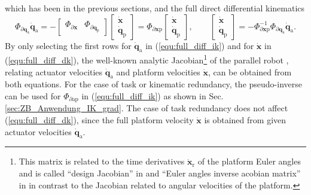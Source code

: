 \documentclass[robotics,article,submit,moreauthors,pdftex]{Definitions/mdpi}
\newcommand{\bm}[1]{\boldsymbol{#1}}
\let\Phi\varPhi
\begin{document}
%
which has been  in the previous sections, and the full direct differential kinematics
%
\begin{equation}
\bm{\Phi}_{\partial\bm{q}_{\mathrm{a}}} \dot{\bm{q}}_{\mathrm{a}} 
=
- 
\begin{bmatrix} \bm{\Phi}_{\partial\bm{x}} & \bm{\Phi}_{\partial\bm{q}_{\mathrm{p}}} \end{bmatrix}
\begin{bmatrix}
\dot{\bm{x}} \\
\dot{\bm{q}}_{\mathrm{p}}
\end{bmatrix}
=
\bm{\Phi}_{\partial\bm{x}\mathrm{p}}
\begin{bmatrix}
\dot{\bm{x}} \\
\dot{\bm{q}}_{\mathrm{p}}
\end{bmatrix},
\quad\quad
\begin{bmatrix}
\dot{\bm{x}} \\
\dot{\bm{q}}_{\mathrm{p}}
\end{bmatrix}
=
-\bm{\Phi}_{\partial\bm{x}\mathrm{p}}^{-1} \bm{\Phi}_{\partial\bm{q}_{\mathrm{a}}}
\dot{\bm{q}}_{\mathrm{a}}.
\label{equ:full_diff_dk}
\end{equation}
%
By only selecting the first rows for $\dot{\bm{q}}_{\mathrm{a}}$ in (\ref{equ:full_diff_ik}) and for $\dot{\bm{x}}$ in (\ref{equ:full_diff_dk}), the well-known analytic Jacobian\footnote{This matrix is related to the time derivatives $\dot{\bm{x}}_{\mathrm{r}}$ of the platform Euler angles and is called ``design Jacobian'' in \cite{Gogu2008} and ``Euler angles inverse acobian matrix'' in \cite{Merlet2006} in contrast to the Jacobian related to angular velocities of the platform.}  of the parallel robot \cite{Merlet2006,Gogu2008}, relating actuator velocities $\dot{\bm{q}}_{\mathrm{a}}$ and platform velocities $\dot{\bm{x}}$, can be obtained from both equations.
For the case of task or kinematic redundancy, the pseudo-inverse can be used for $\bm{\Phi}_{\partial\mathrm{ap}}$ in (\ref{equ:full_diff_ik}) as shown in Sec.\,\ref{sec:ZB_Anwendung_IK_grad}.
The case of task redundancy does not affect (\ref{equ:full_diff_dk}), since the full platform velocity $\dot{\bm{x}}$ is obtained from given actuator velocities $\dot{\bm{q}}_{\mathrm{a}}$.
\end{document}
